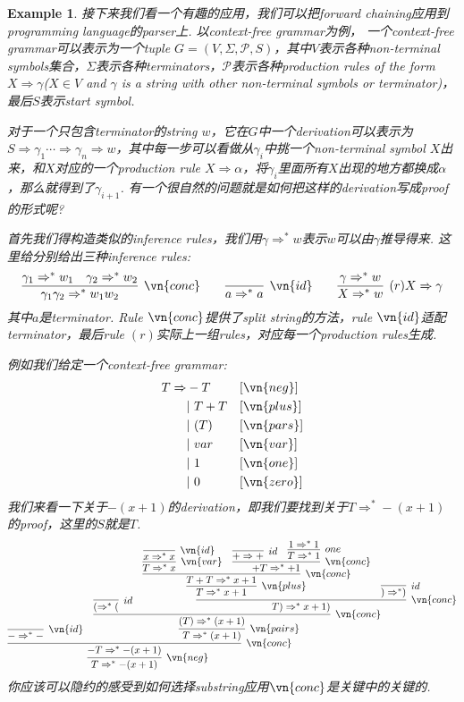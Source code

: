 \documentclass{article}
\theoremstyle{plain}
\newtheorem{example}[theorem]{Example}
\theoremstyle{nonumberplain}
\begin{document}
\begin{example}
\rm 接下来我们看一个有趣的应用，我们可以把forward chaining应用到programming language的parser上. 以context-free grammar为例， 一个context-free grammar可以表示为一个tuple $G = (V, \Sigma, \mathcal{P}, S)$，其中$V$表示各种non-terminal symbols集合，$\Sigma$表示各种terminators，$\mathcal{P}$表示各种production rules of the form $X \Rightarrow \gamma$($X \in V$ and $\gamma$ is a string with other non-terminal symbols or terminator)，最后$S$表示start symbol. 

对于一个只包含terminator的string $w$，它在$G$中一个derivation可以表示为$S \Rightarrow \gamma_1 \cdots \Rightarrow \gamma_n \Rightarrow w$，其中每一步可以看做从$\gamma_i$中挑一个non-terminal symbol $X$出来，和$X$对应的一个production rule $X \Rightarrow \alpha$，将$\gamma_i$里面所有$X$出现的地方都换成$\alpha$，那么就得到了$\gamma_{i+1}$. 有一个很自然的问题就是如何把这样的derivation写成proof的形式呢? 

首先我们得构造类似的inference rules，我们用$\gamma \Rightarrow^* w$表示$w$可以由$\gamma$推导得来. 这里给分别给出三种inference rules:
\[
\infer[\vn{conc}]{\gamma_1 \gamma_2 \Rightarrow^* w_1w_2}{\gamma_1 \Rightarrow^* w_1 & \gamma_2 \Rightarrow^* w_2} \quad\quad
\infer[\vn{id}]{a \Rightarrow^* a}{} \quad\quad
\infer[(r)X \Rightarrow \gamma]{X \Rightarrow^* w}{\gamma \Rightarrow^* w}
\]
其中$a$是terminator. Rule $\vn{conc}$提供了split string的方法，rule $\vn{id}$适配terminator，最后rule $(r)$实际上一组rules，对应每一个production rules生成. 

例如我们给定一个context-free grammar:
\[
\begin{aligned}
T \Rightarrow &  -T && [\vn{neg}]\\
  &|~T+T && [\vn{plus}]\\
  &|~(T) && [\vn{pars}]\\
  &|~var && [\vn{var}]\\
  &|~1 && [\vn{one}]\\
  &|~0 && [\vn{zero}]
\end{aligned}
\]
我们来看一下关于$-(x+1)$的derivation，即我们要找到关于$T \Rightarrow^* -(x+1)$的proof，这里的$S$就是$T$. 
\[
	\infer[\vn{neg}]{T \Rightarrow^* -(x+1)}{\infer[\vn{conc}]{-T \Rightarrow^* -(x+1)}{\infer[\vn{id}]{- \Rightarrow^* -}{} & \infer[\vn{pairs}]{T \Rightarrow^* (x+1)}{\infer[\vn{conc}]{(T) \Rightarrow^* (x+1)}{\infer[id]{( \Rightarrow^* (}{} &  \infer[\vn{conc}]{T)\Rightarrow^* x+1)}{\infer[\vn{plus}]{T \Rightarrow^* x+1}{\infer[\vn{conc}]{T+T \Rightarrow^* x+1}{\infer[\vn{var}]{T \Rightarrow^* x}{\infer[\vn{id}]{x \Rightarrow^* x}{}} & \infer[\vn{conc}]{+T \Rightarrow^* +1}{\infer[id]{+ \Rightarrow +}{} & \infer[one]{T \Rightarrow^* 1}{1 \Rightarrow^* 1} }}} & \infer[id]{) \Rightarrow^* )}{}}}}}}
\]
你应该可以隐约的感受到如何选择substring应用$\vn{conc}$是关键中的关键的.


\end{example}
\end{document}
